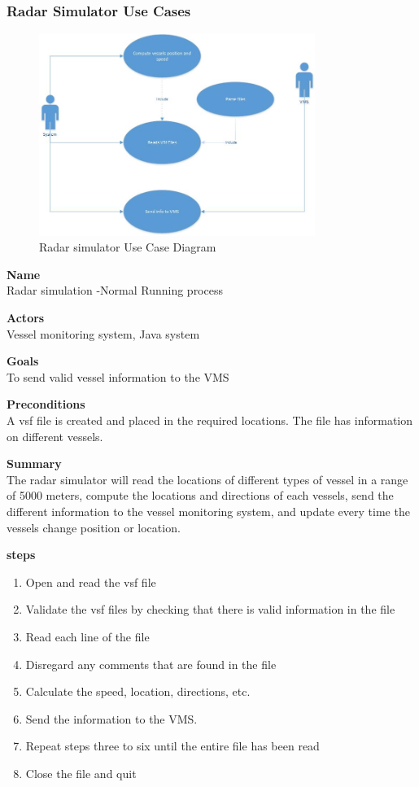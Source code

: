 \subsubsection{ Radar Simulator Use Cases}
\begin{figure}[h]
\caption{Radar simulator Use Case Diagram}
\includegraphics[width=0.8\textwidth]{usecasediagram}
\end{figure}

\noindent
{\bf Name}\\
Radar simulation -Normal Running process

\noindent
{\bf Actors}\\
Vessel monitoring system, Java system

\noindent
{\bf Goals}\\
To send valid vessel information to the VMS

\noindent
{\bf Preconditions }\\
A vsf  file is created and placed in the required locations. 
The file has information on different vessels.

\noindent
{\bf Summary }\\
The radar simulator will read the locations of different types of vessel in a range of 5000 meters,
compute the locations and directions of each vessels, send the different information to the vessel monitoring system, and update every time the vessels change position or location.

\noindent
{\bf steps }\\ 
\begin{enumerate}
\item Open and read the vsf file 
\item Validate the vsf files by checking that there is valid information in the file 
\item Read each line of the file 
\item Disregard any comments that are found in the file
\item Calculate the speed, location, directions, etc.
\item Send the information to the VMS.
\item Repeat steps three to six until the entire file has been read
\item Close the file and quit
\end{enumerate} 

